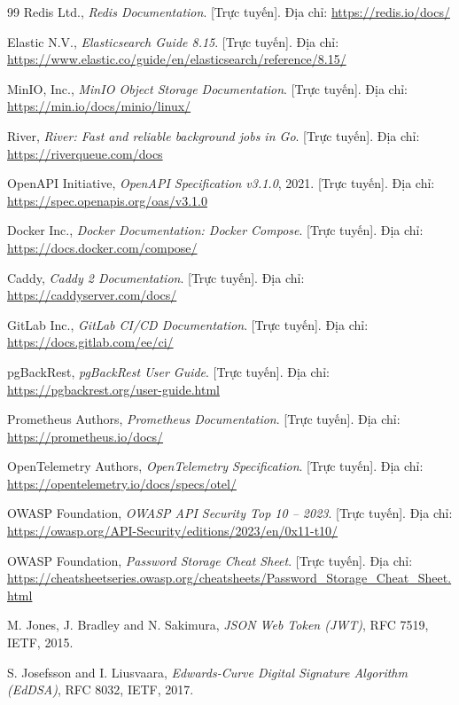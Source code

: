 \begin{thebibliography}{99}
Redis Ltd., \emph{Redis Documentation}. [Trực tuyến]. Địa chỉ: \url{https://redis.io/docs/}

Elastic N.V., \emph{Elasticsearch Guide 8.15}. [Trực tuyến]. Địa chỉ: \url{https://www.elastic.co/guide/en/elasticsearch/reference/8.15/}

MinIO, Inc., \emph{MinIO Object Storage Documentation}. [Trực tuyến]. Địa chỉ: \url{https://min.io/docs/minio/linux/}

River, \emph{River: Fast and reliable background jobs in Go}. [Trực tuyến]. Địa chỉ: \url{https://riverqueue.com/docs}

OpenAPI Initiative, \emph{OpenAPI Specification v3.1.0}, 2021. [Trực tuyến]. Địa chỉ: \url{https://spec.openapis.org/oas/v3.1.0}

Docker Inc., \emph{Docker Documentation: Docker Compose}. [Trực tuyến]. Địa chỉ: \url{https://docs.docker.com/compose/}

Caddy, \emph{Caddy 2 Documentation}. [Trực tuyến]. Địa chỉ: \url{https://caddyserver.com/docs/}

GitLab Inc., \emph{GitLab CI/CD Documentation}. [Trực tuyến]. Địa chỉ: \url{https://docs.gitlab.com/ee/ci/}

pgBackRest, \emph{pgBackRest User Guide}. [Trực tuyến]. Địa chỉ: \url{https://pgbackrest.org/user-guide.html}

Prometheus Authors, \emph{Prometheus Documentation}. [Trực tuyến]. Địa chỉ: \url{https://prometheus.io/docs/}

OpenTelemetry Authors, \emph{OpenTelemetry Specification}. [Trực tuyến]. Địa chỉ: \url{https://opentelemetry.io/docs/specs/otel/}

OWASP Foundation, \emph{OWASP API Security Top 10 – 2023}. [Trực tuyến]. Địa chỉ: \url{https://owasp.org/API-Security/editions/2023/en/0x11-t10/}

OWASP Foundation, \emph{Password Storage Cheat Sheet}. [Trực tuyến]. Địa chỉ: \url{https://cheatsheetseries.owasp.org/cheatsheets/Password_Storage_Cheat_Sheet.html}

M. Jones, J. Bradley and N. Sakimura, \emph{JSON Web Token (JWT)}, RFC 7519, IETF, 2015.

S. Josefsson and I. Liusvaara, \emph{Edwards-Curve Digital Signature Algorithm (EdDSA)}, RFC 8032, IETF, 2017.


\end{thebibliography}
